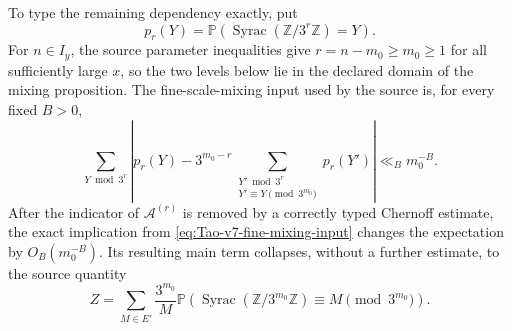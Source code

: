 \begin{proposition}
To type the remaining dependency exactly, put
\[
 p_r(Y)=\mathbb P\!\left(
  \operatorname{Syrac}(\mathbb Z/3^r\mathbb Z)=Y\right).
\]
For \(n\in I_y\), the source parameter inequalities give
\(r=n-m_0\geq m_0\geq1\) for all sufficiently large \(x\), so the two
levels below lie in the declared domain of the mixing proposition.
The fine-scale-mixing input used by the source is, for every fixed \(B>0\),
\begin{equation}
\label{eq:Tao-v7-fine-mixing-input}
 \sum_{Y\bmod3^r}\left|
 p_r(Y)-3^{m_0-r}
 \sum_{\substack{Y'\bmod3^r\\Y'\equiv Y\pmod{3^{m_0}}}}p_r(Y')
 \right|\ll_B m_0^{-B}.
\end{equation}
After the indicator of \(\mathcal A^{(r)}\) is removed by a correctly typed
Chernoff estimate, the exact implication from
\eqref{eq:Tao-v7-fine-mixing-input} changes the expectation by
\(O_B(m_0^{-B})\).  Its resulting main term collapses, without a further
estimate, to the source quantity
\begin{equation}
\label{eq:Tao-v7-Z-repaired}
 Z=\sum_{M\in E'}\frac{3^{m_0}}M
       \mathbb P\!\left(
       \operatorname{Syrac}(\mathbb Z/3^{m_0}\mathbb Z)
          \equiv M\pmod{3^{m_0}}\right).
\end{equation}
\end{proposition}

